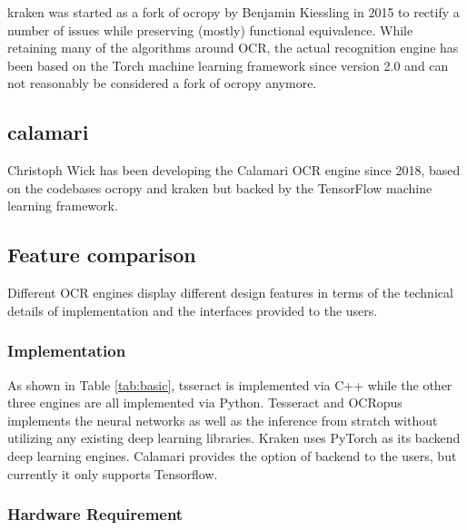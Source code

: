 \documentclass[conference]{IEEEtran}
\begin{document}
kraken \cite{DBLP:journals/corr/RomanovMSK17} was started as a fork of ocropy by Benjamin Kiessling in 2015 to rectify a number of issues while preserving (mostly) functional equivalence. While retaining many of the algorithms around OCR, the actual recognition engine has been based on the Torch machine learning framework since version 2.0 and can not reasonably be considered a fork of ocropy anymore.

\subsection*{calamari}

Christoph Wick has been developing the Calamari \cite{DBLP:journals/corr/abs-1807-02004}
OCR engine since 2018, based on the codebases ocropy and kraken but backed by the
TensorFlow machine learning framework.

\subsection*{Feature comparison}


Different OCR engines display different design features in terms of the technical details of implementation and the interfaces provided to the users. 

\subsubsection*{Implementation}

As shown in Table \ref{tab:basic}, tsseract is implemented via C++ while the other three engines are all implemented via Python.  Tesseract and OCRopus implements the neural networks as well as the inference from stratch without utilizing any existing deep learning libraries. Kraken uses PyTorch as its backend deep learning engines. Calamari provides the option of backend to the users, but currently it only supports Tensorflow.

\subsubsection*{Hardware Requirement}
\end{document}
